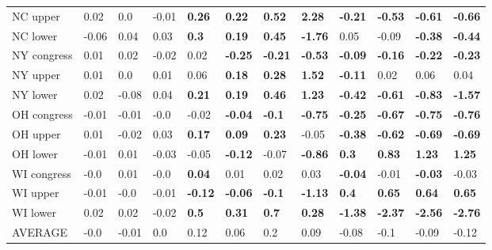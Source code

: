 \begin{tabular}{llllllllllll}
NC upper    &    0.02 &             0.0 &           -0.01 &   \textbf{0.26} &   \textbf{0.22} &   \textbf{0.52} &   \textbf{2.28} &  \textbf{-0.21} &  \textbf{-0.53} &  \textbf{-0.61} &  \textbf{-0.66} \\
NC lower    &   -0.06 &            0.04 &            0.03 &    \textbf{0.3} &   \textbf{0.19} &   \textbf{0.45} &  \textbf{-1.76} &            0.05 &           -0.09 &  \textbf{-0.38} &  \textbf{-0.44} \\
NY congress &    0.01 &            0.02 &           -0.02 &            0.02 &  \textbf{-0.25} &  \textbf{-0.21} &  \textbf{-0.53} &  \textbf{-0.09} &  \textbf{-0.16} &  \textbf{-0.22} &  \textbf{-0.23} \\
NY upper    &    0.01 &             0.0 &            0.01 &            0.06 &   \textbf{0.18} &   \textbf{0.28} &   \textbf{1.52} &  \textbf{-0.11} &            0.02 &            0.06 &            0.04 \\
NY lower    &    0.02 &           -0.08 &            0.04 &   \textbf{0.21} &   \textbf{0.19} &   \textbf{0.46} &   \textbf{1.23} &  \textbf{-0.42} &  \textbf{-0.61} &  \textbf{-0.83} &  \textbf{-1.57} \\
OH congress &   -0.01 &           -0.01 &            -0.0 &           -0.02 &  \textbf{-0.04} &   \textbf{-0.1} &  \textbf{-0.75} &  \textbf{-0.25} &  \textbf{-0.67} &  \textbf{-0.75} &  \textbf{-0.76} \\
OH upper    &    0.01 &           -0.02 &            0.03 &   \textbf{0.17} &   \textbf{0.09} &   \textbf{0.23} &           -0.05 &  \textbf{-0.38} &  \textbf{-0.62} &  \textbf{-0.69} &  \textbf{-0.69} \\
OH lower    &   -0.01 &            0.01 &           -0.03 &           -0.05 &  \textbf{-0.12} &           -0.07 &  \textbf{-0.86} &    \textbf{0.3} &   \textbf{0.83} &   \textbf{1.23} &   \textbf{1.25} \\
WI congress &    -0.0 &            0.01 &            -0.0 &   \textbf{0.04} &            0.01 &            0.02 &            0.03 &  \textbf{-0.04} &           -0.01 &  \textbf{-0.03} &           -0.03 \\
WI upper    &   -0.01 &            -0.0 &           -0.01 &  \textbf{-0.12} &  \textbf{-0.06} &   \textbf{-0.1} &  \textbf{-1.13} &    \textbf{0.4} &   \textbf{0.65} &   \textbf{0.64} &   \textbf{0.65} \\
WI lower    &    0.02 &            0.02 &           -0.02 &    \textbf{0.5} &   \textbf{0.31} &    \textbf{0.7} &   \textbf{0.28} &  \textbf{-1.38} &  \textbf{-2.37} &  \textbf{-2.56} &  \textbf{-2.76} \\
AVERAGE     &    -0.0 &           -0.01 &             0.0 &            0.12 &            0.06 &             0.2 &            0.09 &           -0.08 &            -0.1 &           -0.09 &           -0.12 \\
\bottomrule
\end{tabular}
